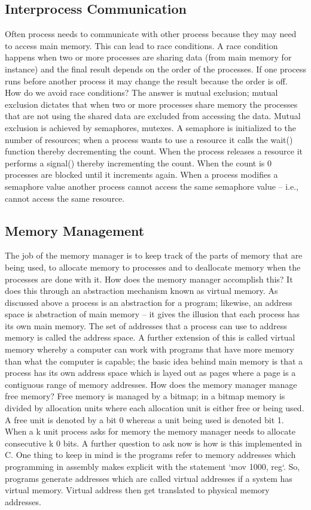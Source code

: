 \documentclass[10pt]{article}
\begin{document}
\subsection{Interprocess Communication}
Often process needs to communicate with other process because they may need to access main memory. This can lead to race conditions. A race condition happens when two or more processes are sharing data (from main memory for instance) and the final result depends on the order of the processes. If one process runs before another process it may change the result because the order is off. How do we avoid race conditions? The answer is mutual exclusion; mutual exclusion dictates that when two or more processes share memory the processes that are not using the shared data are excluded from accessing the data. Mutual exclusion is achieved by semaphores, mutexes. A semaphore is initialized to the number of resources; when a process wants to use a resource it calls the wait() function thereby decrementing the count. When the process releases a resource it performs a signal() thereby incrementing the count. When the count is 0 processes are blocked until it increments again. When a process modifies a semaphore value another process cannot access the same semaphore value -- i.e., cannot access the same resource.

\subsection{Memory Management}
The job of the memory manager is to keep track of the parts of memory that are being used, to allocate memory to processes and to deallocate memory when the processes are done with it. How does the memory manager accomplish this? It does this through an abstraction mechanism known as virtual memory. As discussed above a process is an abstraction for a program; likewise, an address space is abstraction of main memory -- it gives the illusion that each process has its own main memory. The set of addresses that a process can use to address memory is called the address space. A further extension of this is called virtual memory whereby a computer can work with programs that have more memory than what the computer is capable; the basic idea behind main memory is that a process has its own address space which is layed out as pages where a page is a contiguous range of memory addresses. How does the memory manager manage free memory? Free memory is managed by a bitmap; in a bitmap memory is divided by allocation units where each allocation unit is either free or being used. A free unit is denoted by a bit 0 whereas a unit being used is denoted bit 1. When a k unit process asks for memory the memory manager needs to allocate consecutive k 0 bits. A further question to ask now is how is this implemented in C. One thing to keep in mind is the programs refer to memory addresses which programming in assembly makes explicit with the statement `mov 1000, reg`. So, programs generate addresses which are called virtual addresses if a system has virtual memory. Virtual address then get translated to physical memory addresses.
\end{document}
